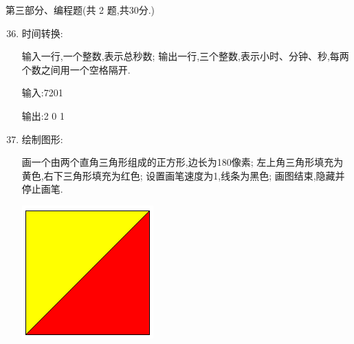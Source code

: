 \documentclass[11pt]{ctexart}
\begin{document}
    \newpage
    {\noindent\heiti 第三部分、编程题(共 2 题,共30分.)}
    \begin{enumerate}
        \setcounter{enumi}{35}
        
        \item 时间转换:
        \begin{tasks}[label = (\arabic*)]
            \task 输入一行,一个整数,表示总秒数;
            \task 输出一行,三个整数,表示小时、分钟、秒,每两个数之间用一个空格隔开.

            {\heiti 输入:}7201

            {\heiti 输出:}2 0 1
        \end{tasks}
        \vfill

        \item 绘制图形:
        
        \begin{tasks}[label = (\arabic*)]
            \task 画一个由两个直角三角形组成的正方形,边长为180像素;
            \task 左上角三角形填充为黄色,右下三角形填充为红色;
            \task 设置画笔速度为1,线条为黑色;
            \task 画图结束,隐藏并停止画笔.
        \end{tasks}
        \begin{center}
            \includegraphics[width=.2\textwidth]{37.png}
        \end{center}
        \vfill
    \end{enumerate}
\end{document}
